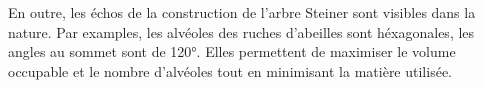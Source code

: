 \documentclass[10pt,a4paper]{article}%
\theoremstyle{theorem}
\theoremstyle{definition}
\begin{document}
	En outre, les échos de la construction de l'arbre Steiner sont visibles dans la nature. Par examples, les alvéoles des ruches d’abeilles sont héxagonales, les angles au sommet sont de 120°. Elles permettent de maximiser le volume occupable et le nombre
	d’alvéoles tout en minimisant la matière utilisée.
%	
%		
%		
%		 
		
		
		

	
	
		
		         
		         
		         
	        
	        
        
       
\end{document}
